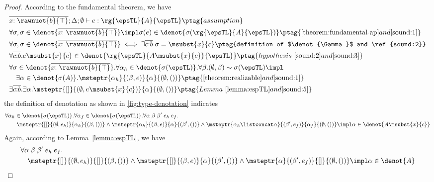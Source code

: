 \begin{proof} According to the fundamental theorem, we have
{\footnotesize\begin{alignat}{2}
\setcounter{equation}{0}
    &\overline{x{:\rawnuot{b}{\top}}} ;\Delta; \emptyset \vdash e : \rg{\epsTL}{A}{\epsTL} \ptag{assumption} \label{sound:1}
    \\&\forall \sigma, \sigma \in
    \denot{\overline{x{:\rawnuot{b}{\top}}}} \impl \sigma(e) \in
    \denot{\sigma(\rg{\epsTL}{A}{\epsTL})} \ptag{\autoref{theorem:fundamental-ap} and \ref{sound:1}} \label{sound:2}
    \\&\forall \sigma, \sigma \in
    \denot{\overline{x{:\rawnuot{b}{\top}}}} \iff \exists \overline{c{:}b}. \sigma =\msubst{x}{c}  \ptag{definition of $\denot{\Gamma}$ and \ref{sound:2}}  \label{sound:3}
    \\&\forall \overline{c{:}b}. e\msubst{x}{c} \in
    \denot{\rg{\epsTL}{A\msubst{x}{c}}{\epsTL}} \ptag{hypothesis~\ref{sound:2} and \ref{sound:3}} \label{sound:4}
    \\& \forall \sigma \in \denot{\overline{x{:\rawnuot{b}{\top}}}}.\forall \alpha_h \in \denot{\sigma(\epsTL)}. \forall \beta. (\emptyset, \beta) \sim \sigma(\epsTL) \impl \notag \\&\quad\exists \alpha \in\denot{\sigma(A)}. \msteptr{\alpha_h}{(\beta, e)}{\alpha}{(\emptyset, ())} 
    \ptag{\autoref{theorem:realizable} and \ref{sound:1}} \label{sound:5}
    \\&\exists \overline{c{:}b}. \exists \alpha. \msteptr{[]}{(\emptyset, e\msubst{x}{c})}{\alpha}{(\emptyset, ())} 
    \ptag{Lemma~\ref{lemma:espTL} and \ref{sound:5}} \label{sound:6}
\end{alignat}}\noindent
the definition of \PAT denotation as shown in \autoref{fig:type-denotation} indicates
{\footnotesize\begin{align*}
    &\forall \alpha_h \in\denot{\sigma(\epsTL)}.\forall \alpha_f \in\denot{\sigma(\epsTL)}. \forall \alpha\; \beta\;\beta'\;e_h\;e_f.
  \\&\qquad \msteptr{[]}{(\emptyset, e_h)}{\alpha_h}{(\beta, ())}\land \msteptr{\alpha_h}{(\beta, e)}{\alpha}{(\beta', ())} \land \msteptr{\alpha_h \listconcat \alpha }{(\beta', e_f)}{\alpha_f}{(\emptyset, ())} \impl \alpha \in\denot{A\msubst{x}{c}}
\end{align*}}\noindent
Again, according to Lemma~\ref{lemma:espTL}, we have
{\footnotesize\begin{alignat}{2}
  &\forall \alpha\;\beta\;\beta'\;e_h\;e_f. \notag
  \\&\quad \msteptr{[]}{(\emptyset, e_h)}{[]}{(\beta, ())} \land \msteptr{[]}{(\beta, e)}{\alpha}{(\beta', ())} \land \msteptr{\alpha }{(\beta', e_f)}{[]}{(\emptyset, ())} \impl \alpha \in\denot{A} \label{sound:7}

\end{alignat}}
\end{proof}

